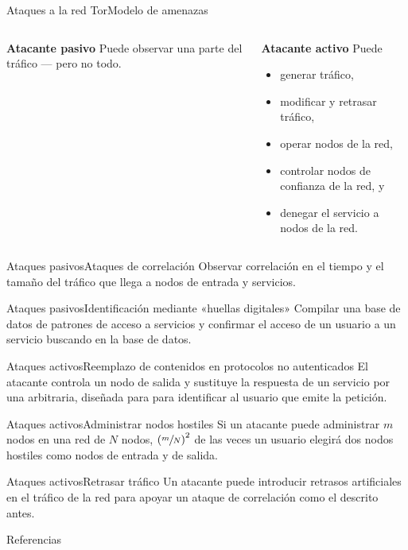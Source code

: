 \documentclass[spanish]{beamer}
\begin{document}
\begin{frame}{Ataques a la red Tor}{Modelo de amenazas}
  \begin{columns}[t]
    
    \begin{block}{\textbf{Atacante pasivo}}
      Puede observar una parte del tráfico --- pero no todo.
    \end{block}
    
    
    \begin{block}{\textbf{Atacante activo}}
      Puede
      \begin{itemize}
      \item generar tráfico,
      \item modificar y retrasar tráfico,
      \item operar nodos de la red,
      \item controlar nodos de confianza de la red, y
      \item denegar el servicio a nodos de la red.
      \end{itemize}
    \end{block}
  \end{columns}
\end{frame}

\begin{frame}{Ataques pasivos}{Ataques de correlación} 
  Observar correlación en el tiempo y el tamaño del tráfico que llega a nodos de entrada
  y servicios.
\end{frame}

\begin{frame}{Ataques pasivos}{Identificación mediante «huellas digitales»}
  Compilar una base de datos de patrones de acceso a servicios y confirmar el acceso de
  un usuario a un servicio buscando en la base de datos.
\end{frame}

\begin{frame}{Ataques activos}{Reemplazo de contenidos en protocolos no autenticados}
  El atacante controla un nodo de salida y sustituye la respuesta de un servicio
  por una arbitraria, diseñada para para identificar al usuario que emite la
  petición.
\end{frame}

\begin{frame}{Ataques activos}{Administrar nodos hostiles}
 Si un atacante puede administrar $m$ nodos en una red de $N$ nodos,
 $\left(\sfrac{m}{N}\right)^2$ de las veces un usuario elegirá dos nodos
 hostiles como nodos de entrada y de salida.
\end{frame}

\begin{frame}{Ataques activos}{Retrasar tráfico}
Un atacante puede introducir retrasos artificiales en el tráfico de la red para
apoyar un ataque de correlación como el descrito antes.
\end{frame}

\begin{frame}[t,allowframebreaks]{Referencias}
  \printbibliography[heading=none]
\end{frame}
\end{document}

